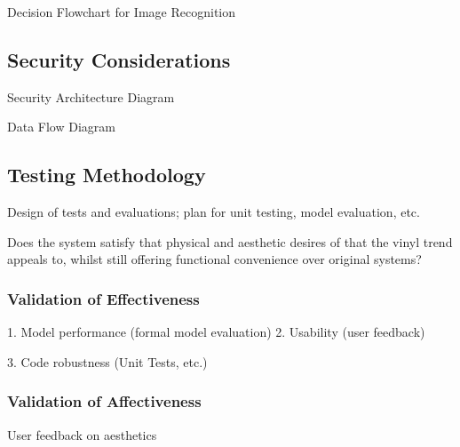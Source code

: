                 \begin{temp}
                    Decision Flowchart for Image Recognition
                \end{temp}
        
        \subsection{Security Considerations}
    
            \begin{temp}
                Security Architecture Diagram
            \end{temp}
    
            \begin{temp}
                Data Flow Diagram
            \end{temp}
        
        \subsection{Testing Methodology}
    
            \begin{temp}
                Design of tests and evaluations; plan for unit testing, model evaluation, etc.
                
                Does the system satisfy that physical and aesthetic desires of that the vinyl trend appeals to, whilst still offering functional convenience over original systems?
            \end{temp}
            
            \subsubsection{Validation of Effectiveness}
                \begin{temp}
                1. Model performance (formal model evaluation)
                2. Usability (user feedback)
                
                3. Code robustness (Unit Tests, etc.)
                \end{temp}
        
        \subsubsection{Validation of Affectiveness}
            \begin{temp}
                User feedback on aesthetics
            \end{temp}
    
